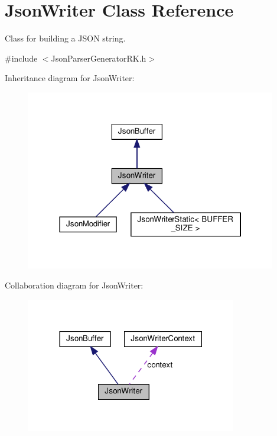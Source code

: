 \hypertarget{class_json_writer}{}\section{Json\+Writer Class Reference}
\label{class_json_writer}


Class for building a J\+S\+ON string.  




{\ttfamily \#include $<$Json\+Parser\+Generator\+R\+K.\+h$>$}



Inheritance diagram for Json\+Writer\+:\nopagebreak
\begin{figure}[H]
\begin{center}
\leavevmode
\includegraphics[width=310pt]{class_json_writer__inherit__graph}
\end{center}
\end{figure}


Collaboration diagram for Json\+Writer\+:\nopagebreak
\begin{figure}[H]
\begin{center}
\leavevmode
\includegraphics[width=260pt]{class_json_writer__coll__graph}
\end{center}
\end{figure}
